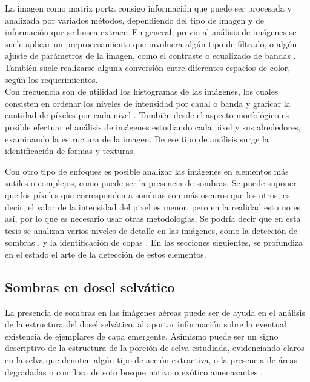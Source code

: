La imagen como matriz porta consigo información que puede ser procesada y analizada por variados métodos, dependiendo del tipo de imagen y de información que se busca extraer. En general, previo al análisis de imágenes se suele aplicar un preprocesamiento que involucra algún tipo de filtrado, o algún ajuste de parámetros de la imagen, como el contraste o ecualizado de bandas \cite{sonka_image_1993}. También suele realizarse alguna conversión entre diferentes espacios de color, según los requerimientos.\\

Con frecuencia son de utilidad los histogramas de las imágenes, los cuales consisten en ordenar los niveles de intensidad por canal o banda y graficar la cantidad de píxeles por cada nivel \cite{atienza_histograma_nodate}. También desde el aspecto morfológico es posible efectuar el análisis de imágenes estudiando cada pixel y sus alrededores, examinando la estructura de la imagen. De ese tipo de análisis surge la identificación de formas y texturas.

Con otro tipo de enfoques es posible analizar las imágenes en elementos más sutiles o complejos, como puede ser la presencia de sombras. Se puede suponer que los píxeles que corresponden a sombras son más oscuros que los otros, es decir, el valor de la intensidad del pixel es menor, pero en la realidad esto no es así, por lo que es necesario usar otras metodologías. 
Se podría decir que en esta tesis se analizan varios niveles de detalle en las imágenes, como la detección de sombras \cite{bernhardt_identification_2023}, y la identificación de copas \cite{hubert_wagner_individual_2018}.
En las secciones siguientes, se profundiza en el estado el arte de la detección de estos elementos.

\subsection{Sombras en dosel selvático}
La presencia de sombras en las imágenes aéreas puede ser de ayuda en el análisis de la estructura del dosel selvático, al aportar información sobre la eventual existencia de ejemplares de capa emergente. Asimismo puede ser un signo descriptivo de la estructura de la porción de selva estudiada, evidenciando claros en la selva que denoten algún tipo de acción extractiva, o la presencia de áreas degradadas o con flora de soto bosque nativo o exótico amenazantes \cite{bedrij_selective_2022}.

